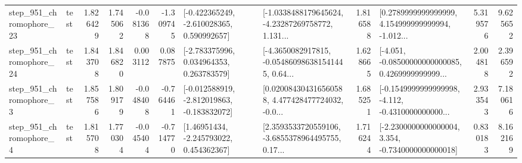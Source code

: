 \begin{tabular}{llrrrrllrlrr}
  step\_951\_chromophore\_23 &      test &      1.826429 &    1.745062 &     -0.081368 & -1.309745 &   [-0.422365249, -2.610028365, 0.590992657] &  [-1.0338488179645624, -4.23287269758772, 1.131... &       1.816588 &  [0.2789999999999999, 4.154999999999994, -1.012... &            5.319576 &          9.625652 \\
  step\_951\_chromophore\_24 &      test &      1.843708 &    1.846820 &      0.003112 &  0.087875 &    [-2.783375996, 0.034964353, 0.263783579] &  [-4.3650082917815, -0.054860986381541445, 0.64... &       1.628665 &  [-4.051, -0.08500000000000085, 0.4269999999999... &            2.004818 &          2.396592 \\
   step\_951\_chromophore\_3 &      test &      1.857586 &    1.809179 &     -0.048408 & -0.764461 &  [-0.012588919, -2.812019863, -0.183832072] &  [0.020084304316560588, 4.477428477724032, -0.0... &       1.685251 &  [-0.1549999999999998, -4.112, -0.4310000000000... &            2.933543 &          7.180616 \\
   step\_951\_chromophore\_4 &      test &      1.815708 &    1.770304 &     -0.045404 & -0.714770 &     [1.46951434, -2.245793022, 0.454362367] &  [2.3593533720559106, -3.6855378964495755, 0.17... &       1.716244 &  [-2.2300000000000004, 3.354, -0.7340000000000018] &            0.830183 &          8.162169 \\
\bottomrule
\end{tabular}


